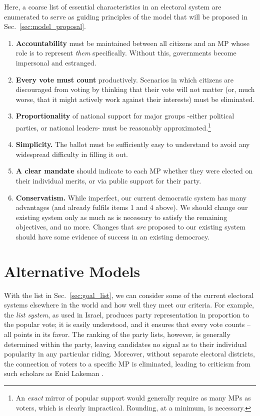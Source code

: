 \documentclass[DIV=calc, paper=a4, fontsize=11pt, twocolumn]{scrartcl}	 %
\begin{document}
Here, a coarse list of essential characteristics in an electoral system are enumerated to serve as guiding principles of the model that will be proposed in Sec.~\ref{sec:model_proposal}.  
\begin{enumerate}
\item \textbf{Accountability} must be maintained between all citizens and an MP whose role is to represent \emph{them} specifically. Without this, governments become impersonal and estranged.
\item \textbf{Every vote must count} productively. Scenarios in which citizens are discouraged from voting by thinking that their vote will not matter (or, much worse, that it might actively work against their interests) must be eliminated.
\item \textbf{Proportionality} of national support for major groups \--either political parties, or national leaders\-- must be reasonably approximated.\footnote{
An \emph{exact} mirror of popular support would generally require as many MPs as voters, which is clearly impractical. Rounding, at a minimum, is necessary.
}
\item   \textbf{Simplicity.} The ballot must be sufficiently easy to understand to avoid any widespread difficulty in filling it out. 

\item  \textbf{A clear mandate} should indicate to each MP whether they were elected on their individual merits, or via public support for their party.
\item \textbf{Conservatism.} While imperfect, our current democratic system has many advantages (and already fulfils items 1 and 4 above). We should change our existing system only as much as is necessary to satisfy the remaining objectives, and no more. Changes that \emph{are} proposed to our existing system should have some evidence of success in an existing democracy.
\end{enumerate}


\section{Alternative Models}
\label{sec:alt_models}

With the list in Sec.~\ref{sec:goal_list}, we can consider some of the current electoral systems elsewhere in the world and how well they meet our criteria. For example, the \emph{list system}, as used in Israel, produces party representation in proportion to the popular vote; it is easily understood, and it ensures that every vote counts \---all points in its favor. 
The ranking of the party lists, however, is generally determined within the party, leaving candidates no signal as to their individual popularity in any particular riding. Moreover, without separate electoral districts, the connection of voters to a specific MP is eliminated, leading to criticism from such scholars as Enid Lakeman\cite{Lakeman}
.
\end{document}

